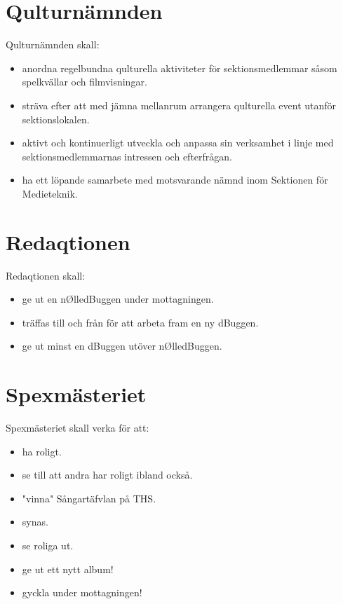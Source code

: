 \documentclass[a4paper]{article}
\begin{document}
\section{Qulturnämnden}
Qulturnämnden skall:
\begin{itemize}
\item anordna regelbundna qulturella aktiviteter för sektionsmedlemmar såsom spelkvällar och filmvisningar.
\item sträva efter att med jämna mellanrum arrangera qulturella event utanför sektionslokalen.
\item aktivt och kontinuerligt utveckla och anpassa sin verksamhet i linje med sektionsmedlemmarnas intressen och efterfrågan.
\item ha ett löpande samarbete med motsvarande nämnd inom Sektionen för Medieteknik.
\end{itemize}

\section{Redaqtionen}
Redaqtionen skall:
\begin{itemize}
\item ge ut en n\O lledBuggen under mottagningen.
\item träffas till och från för att arbeta fram en ny dBuggen.
\item ge ut minst en dBuggen utöver n\O lledBuggen. 
\end{itemize}

\section{Spexmästeriet}
Spexmästeriet skall verka för att:
\begin{itemize}
\item ha roligt.
\item se till att andra har roligt ibland också.
\item "vinna" Sångartäfvlan på THS.
\item synas.
\item se roliga ut.
\item ge ut ett nytt album!
\item gyckla under mottagningen!
\end{itemize}
\end{document}
